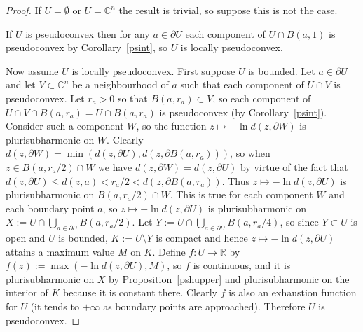 \documentclass[11pt,a4paper, final, twoside]{article}
\numberwithin{equation}{section}
\newcommand{\C}{\mathbb C}
\newcommand{\R}{\mathbb R}
\newcommand{\bd}{\partial}
\newcommand{\ball}{B}
\newcommand{\emetric}{d}
\begin{document}
\begin{proof}
If $U=\emptyset$ or $U=\C^n$ the result is trivial, so suppose this is not the case.

If $U$ is pseudoconvex then for any $a\in\bd U$ each component of $U\cap\ball(a,1)$ is pseudoconvex by Corollary~\ref{psint}, so $U$ is locally pseudoconvex.

Now assume $U$ is locally pseudoconvex. 
First suppose $U$ is bounded. Let $a\in\bd U$ and let $V\subset\C^n$ be a neighbourhood of $a$ such that each component of $U\cap V$ is pseudoconvex. Let
$r_a>0$ so that $\ball(a,r_a)\subset V$, so each component of $U\cap V\cap \ball(a,r_a)=U\cap\ball(a,r_a)$ is pseudoconvex (by Corollary~\ref{psint}).
Consider such a component $W$, so the function $z\mapsto -\ln\emetric(z,\bd W)$ is plurisubharmonic on $W$. 
Clearly $\emetric(z,\bd W)=\min(\emetric(z,\bd U),\emetric(z,\bd\ball(a,r_a)))$,
so when $z\in\ball(a,r_a/2)\cap W$ we have $\emetric(z,\bd W)=\emetric(z,\bd U)$ by virtue of the fact that $\emetric(z,\bd U)\leq \emetric(z,a)<r_a/2<\emetric(z,\bd\ball(a,r_a))$. Thus
$z\mapsto -\ln\emetric(z,\bd U)$ is plurisubharmonic on $\ball(a,r_a/2)\cap W$. This is true for each component $W$ and each boundary point $a$, so $z\mapsto -\ln\emetric(z,\bd U)$ 
is plurisubharmonic on $X:=U\cap\bigcup_{a\in\bd U}\ball(a,r_a/2)$. Let $Y:=U\cap\bigcup_{a\in\bd U}\ball(a,r_a/4)$, so since $Y\subset U$ is open and $U$ is bounded, $K:=U\setminus Y$ 
is compact and hence $z\mapsto -\ln\emetric(z,\bd U)$ attains a maximum value $M$ on $K$. Define $f\colon U\to\R$ by $f(z):=\max(-\ln\emetric(z,\bd U),M)$, 
so $f$ is continuous, and it is plurisubharmonic on $X$ by Proposition~\ref{pshupper} and plurisubharmonic on the interior of $K$ because it is constant there.
Clearly $f$ is also an exhaustion function for $U$ (it tends to $+\infty$ as boundary points are approached). Therefore $U$ is pseudoconvex.


\end{proof}
\end{document}
